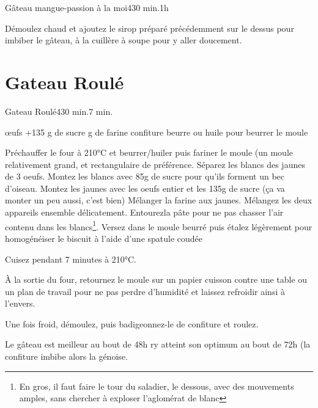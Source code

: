 {\begin{recette}{Gâteau mangue-passion à la moi}{4}{30 min.}{1h}
\begin{cuisson}
Démoulez chaud et ajoutez le sirop préparé précédemment sur le dessus pour imbiber le gâteau, à la cuillère à soupe pour y aller doucement. 
\end{cuisson}
\end{recette}

\section{Gateau Roulé}
\begin{recette}{Gateau Roulé}{4}{30 min.}{7 min.}
\begin{ingredients}%
 œufs
+135 g de sucre
 g de farine
\ingredient confiture
\ingredient beurre ou huile pour beurrer le moule
\end{ingredients}

\begin{preparation}
\etape Préchauffer le four à 210°C et beurrer/huiler puis fariner le moule (un moule relativement grand, et rectangulaire de 
préférence.
\etape Séparez les blancs des jaunes de 3 oeufs. 
\etape Montez les  blancs avec 85g de sucre pour qu'ils forment un bec d'oiseau.
\etape Montez les jaunes avec les oeufs entier et les 135g de sucre (ça va monter un peu aussi, c'est bien)
\etape Mélanger la farine aux jaunes.
\etape Mélangez les deux appareils ensemble délicatement. \og Entourez\fg la pâte pour ne pas chasser l'air contenu dans les blancs\footnote{En gros, il faut faire le tour du 
saladier, le dessous, avec des mouvements amples, sans chercher à exploser l'aglomérat de blanc}.
\etape Versez dans le moule beurré puis étalez légèrement pour homogénéiser le biscuit à l'aide d'une spatule coudée
\end{preparation}

\begin{cuisson}
Cuisez pendant 7 minutes à 210°C.

À la sortie du four, retournez le moule sur un papier cuisson contre une table ou un plan de travail pour ne pas perdre d'humidité et laissez refroidir ainsi à l'envers.

Une fois froid, démoulez, puis badigeonnez-le de confiture et roulez.

\begin{remarque}
Le gâteau est meilleur au bout de 48h ry atteint son optimum au bout de 72h (la confiture imbibe alors la génoise.
\end{remarque}
\end{cuisson}
\end{recette}

}
